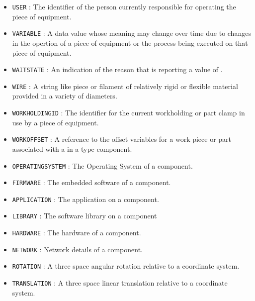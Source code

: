 \begin{itemize}
\item \texttt{USER} : The identifier of the person currently responsible for operating the piece of equipment. 

\item \texttt{VARIABLE} : A data value whose meaning may change over time due to changes in the opertion of a piece of equipment or the process being executed on that piece of equipment. 

\item \texttt{WAIT\textunderscore STATE} : An indication of the reason that  is reporting a value of . 

\item \texttt{WIRE} : A string like piece or filament of relatively rigid or flexible material provided in a variety of diameters. 

\item \texttt{WORKHOLDING\textunderscore ID} : The identifier for the current workholding or part clamp in use by a piece of equipment. 

\item \texttt{WORK\textunderscore OFFSET} : A reference to the offset variables for a work piece or part associated with a  in a  type component. 

\item \texttt{OPERATING\textunderscore SYSTEM} : The Operating System of a component. 

\item \texttt{FIRMWARE} : The embedded software of a component.
 

\item \texttt{APPLICATION} : The application on a component. 

\item \texttt{LIBRARY} : The software library on a component 

\item \texttt{HARDWARE} : The hardware of a component.
 

\item \texttt{NETWORK} : Network details of a component. 

\item \texttt{ROTATION} : A three space angular rotation relative to a coordinate system. 

\item \texttt{TRANSLATION} : A three space linear translation relative to a coordinate system. 

\end{itemize}

